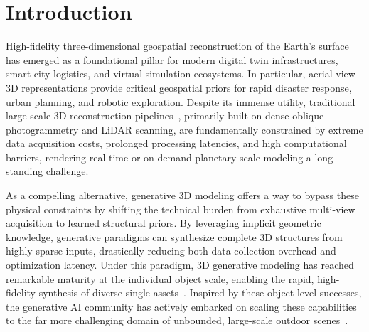 \section{Introduction}
\label{sec:intro}


High-fidelity three-dimensional geospatial reconstruction of the Earth's surface has emerged as a foundational pillar for modern digital twin infrastructures, smart city logistics, and virtual simulation ecosystems. In particular, aerial-view 3D representations provide critical geospatial priors for rapid disaster response, urban planning, and robotic exploration. Despite its immense utility, traditional large-scale 3D reconstruction pipelines~\cite{schoenberger2016sfm,schoenberger2016mvs,nex2014uav,WEHR199968,shan2018topographic}, primarily built on dense oblique photogrammetry and LiDAR scanning, are fundamentally constrained by extreme data acquisition costs, prolonged processing latencies, and high computational barriers, rendering real-time or on-demand planetary-scale modeling a long-standing challenge.

As a compelling alternative, generative 3D modeling offers a way to bypass these physical constraints by shifting the technical burden from exhaustive multi-view acquisition to learned structural priors. By leveraging implicit geometric knowledge, generative paradigms can synthesize complete 3D structures from highly sparse inputs, drastically reducing both data collection overhead and optimization latency. Under this paradigm, 3D generative modeling has reached remarkable maturity at the individual object scale, enabling the rapid, high-fidelity synthesis of diverse single assets~\cite{xiang2025native,xiang2025structured,CLAY,hunyuan3d22025tencent,lai2025hunyuan3d25highfidelity3d,Seed3D,gao2022get3d,jun2023shapegeneratingconditional3d}. Inspired by these object-level successes, the generative AI community has actively embarked on scaling these capabilities to the far more challenging domain of unbounded, large-scale outdoor scenes~\cite{earthcrafter,CityDreamer,sat2city,lin2023infinicity,sat2scene,Yang_2023_ICCV,Qian_2023_Sat2Density,sat2densitypp,qian2026sat3dgen,infinite_nature_2020}. 


